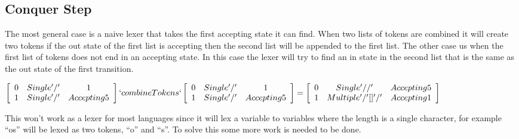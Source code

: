 \subsection{Conquer Step}
The most general case is a naive lexer that takes the first accepting state it
can find. When two lists of tokens are combined it will create two tokens if the
out state of the first list is accepting then the second list will be appended
to the first list. The other case us when the first list of tokens does not end
in an accepting state. In this case the lexer will try to find an in state in
the second list that is the same as the out state of the first transition.
\begin{center}
$\left[\begin{array}{ccc}
0&Single '/'&1\\
1&Single '/'&Accepting 5\\
\end{array}\right] `combineTokens`
\left[\begin{array}{ccc}
0&Single '/'&1\\
1&Single '/'&Accepting 5\\
\end{array}\right] =
\left[\begin{array}{ccc}
0&Single '//'&Accepting 5\\
1&Multiple '/' [] '/'&Accepting 1\\
\end{array}\right]$
\end{center}
This won't work as a lexer for most languages since it will lex a variable to
variables where the length is a single character, for example ``os'' will be
lexed as two tokens, ``o'' and ``s''. To solve this some more work is needed to
be done.
